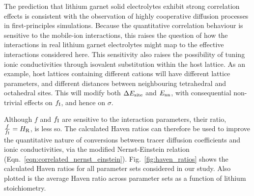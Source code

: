 \documentclass[aps,prb,twocolumn,superscriptaddress,reprint]{revtex4-1}
\begin{document}
The prediction that lithium garnet solid electrolytes exhibit strong correlation effects is consistent with the observation of highly cooperative diffusion processes in first-principles simulations.\cite{JalemEtAl_ChemMater2013, MeierEtAl_JPhysChemC2014} Because the quantitative correlation behaviour is sensitive to the mobile-ion interactions, this raises the question of how the interactions in real lithium garnet electrolytes might map to the effective interactions considered here. This sensitivity also raises the possibility of tuning ionic conductivities through isovalent substitution within the host lattice. As an example, host lattices containing different  cations will have different lattice parameters, and different distances between neighbouring tetrahedral and octahedral sites. This will modify both $\Delta E_{\mathrm{site}}$ and $E_{\mathrm{nn}}$, with consequential non-trivial effects on $f_{\mathrm{I}}$, and hence on $\sigma$. 

Although $f$ and $f_{\mathrm{I}}$ are sensitive to the interaction parameters, their ratio, $\frac{f}{f_{\mathrm{I}}}=H_{\mathrm{R}}$, is less so. The calculated Haven ratios can therefore be used to improve the quantitative nature of conversions between tracer diffusion coefficients and ionic conductivities, via the modified Nernst-Einstein relation (Eqn.~\ref{eqn:correlated_nernst_einstein}). Fig.~\ref{fig:haven_ratios} shows the calculated Haven ratios for all parameter sets considered in our study. Also plotted is the average Haven ratio across parameter sets as a function of lithium stoichiometry.
\end{document}
